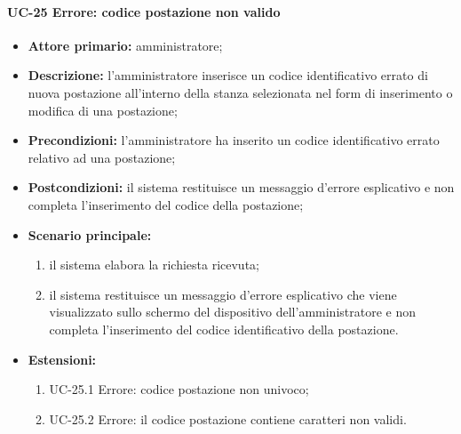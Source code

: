 \paragraph{UC-25 Errore: codice postazione non valido}
\begin{itemize}
	\item \textbf{Attore primario:} amministratore;
	\item \textbf{Descrizione:} l'amministratore inserisce un codice identificativo errato di nuova postazione all'interno della stanza selezionata nel form di inserimento o modifica di una postazione;
	\item \textbf{Precondizioni:} l'amministratore ha inserito un codice identificativo errato relativo ad una postazione;
	\item \textbf{Postcondizioni:} il sistema restituisce un messaggio d'errore esplicativo e non completa l'inserimento del codice della postazione;
	\item \textbf{Scenario principale:}
	      \begin{enumerate}
		      \item il sistema elabora la richiesta ricevuta;
		      \item il sistema restituisce un messaggio d'errore esplicativo che viene visualizzato sullo schermo del dispositivo dell'amministratore e non completa l'inserimento del codice identificativo della postazione.
	      \end{enumerate}
	 \item \textbf{Estensioni:}
	 	\begin{enumerate}
		       \item UC-25.1 Errore: codice postazione non univoco;
		       \item UC-25.2 Errore: il codice postazione contiene caratteri non validi.
	        \end{enumerate}
\end {itemize}

